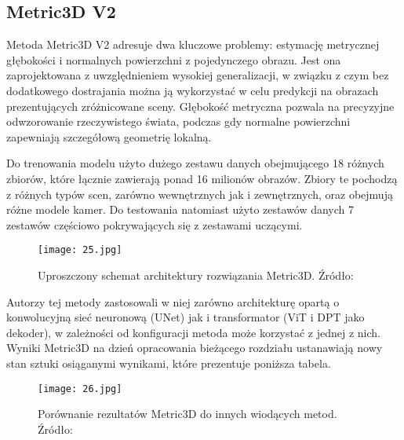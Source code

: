 \subsection{Metric3D V2}
Metoda Metric3D V2 \cite{hu2024} adresuje dwa kluczowe problemy: estymację metrycznej głębokości i normalnych powierzchni z pojedynczego obrazu. Jest ona zaprojektowana z uwzględnieniem wysokiej generalizacji, w związku z czym bez dodatkowego dostrajania można ją wykorzystać w celu predykcji na obrazach prezentujących zróżnicowane sceny.
Głębokość metryczna pozwala na precyzyjne odwzorowanie rzeczywistego świata, podczas gdy normalne powierzchni zapewniają szczegółową geometrię lokalną.

Do trenowania modelu użyto dużego zestawu danych obejmującego 18 różnych zbiorów, które łącznie zawierają ponad 16 milionów obrazów. Zbiory te pochodzą z różnych typów scen, zarówno wewnętrznych jak i zewnętrznych, oraz obejmują różne modele kamer. Do testowania natomiast użyto zestawów danych 7 zestawów częściowo pokrywających się z zestawami uczącymi.

\begin{figure}[H]
    \centering
    \texttt{[image: 25.jpg]}
    \caption{Uproszczony schemat architektury rozwiązania Metric3D. Źródło: \cite{hu2024}}
    \label{fig:metric3d-schema}
\end{figure}

Autorzy tej metody zastosowali w niej zarówno architekturę opartą o konwolucyjną sieć neuronową (UNet) jak i transformator (ViT i DPT jako dekoder), w zależności od konfiguracji metoda może korzystać z jednej z nich. Wyniki Metric3D na dzień opracowania bieżącego rozdziału ustanawiają nowy stan sztuki osiąganymi wynikami, które prezentuje poniższa tabela.
\begin{figure}[H]
    \centering
    \texttt{[image: 26.jpg]}
    \caption{Porównanie rezultatów Metric3D do innych wiodących metod. Źródło: \cite{hu2024}}
    \label{fig:metric3d-results}
\end{figure}

